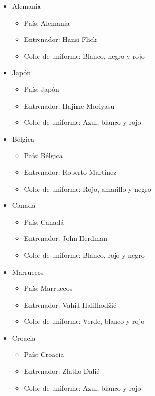 \begin{itemize}
\begin{itemize}
        \end{itemize}
    \item Alemania
        \begin{itemize}
            \item País: Alemania
            \item Entrenador: Hansi Flick
            \item Color de uniforme: Blanco, negro y rojo
        \end{itemize}
    \item Japón
        \begin{itemize}
            \item País: Japón
            \item Entrenador: Hajime Moriyasu
            \item Color de uniforme: Azul, blanco y rojo
        \end{itemize}
    \item Bélgica
        \begin{itemize}
            \item País: Bélgica
            \item Entrenador: Roberto Martínez
            \item Color de uniforme: Rojo, amarillo y negro
        \end{itemize}
    \item Canadá
        \begin{itemize}
            \item País: Canadá
            \item Entrenador: John Herdman
            \item Color de uniforme: Blanco, rojo y negro
        \end{itemize}
    \item Marruecos
        \begin{itemize}
            \item País: Marruecos
            \item Entrenador: Vahid Halilhodžić
            \item Color de uniforme: Verde, blanco y rojo
        \end{itemize}
    \item Croacia
        \begin{itemize}
            \item País: Croacia
            \item Entrenador: Zlatko Dalić
            \item Color de uniforme: Azul, blanco y rojo

\end{itemize}
\end{itemize}
